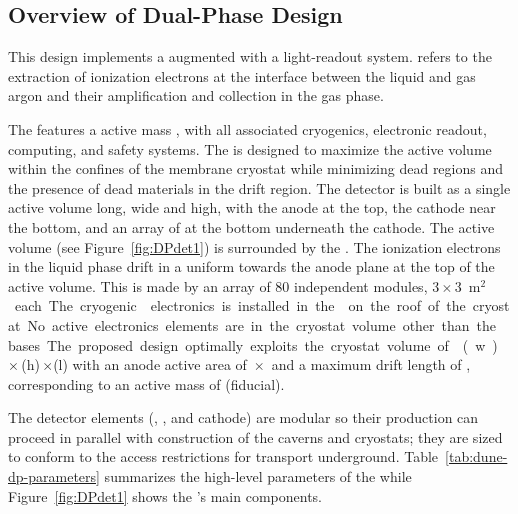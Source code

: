 \subsection{Overview of Dual-Phase Design}
\label{sec:dp-execsum-description}

This  design implements a   augmented with a light-readout system.   refers to the extraction of ionization electrons at the interface between the liquid and gas argon and their amplification and collection in the gas phase.

The  features a  \dpactivelarmass{} active mass , with all associated cryogenics, electronic readout, computing, and safety systems. The  is designed to maximize the active volume within the confines of the membrane cryostat while minimizing dead regions and the presence of dead materials in the drift region. The detector is built as a single active volume \dptpclen long, \dptpcwdth wide and \tpcheight high, with the anode at the top, the cathode near the bottom, and an array of  at the bottom underneath the cathode. The active volume (see Figure~\ref{fig:DPdet1}) is surrounded by the . The ionization electrons in the liquid phase drift  in a uniform \efield towards the anode plane at the top of the active volume. This is made by an array of \num{80} independent  modules, \num{3}\,$\times$\,\SI{3}{m$^2$} each. The cryogenic  electronics is  installed in the  on the roof of the cryostat. No active electronics elements are in the cryostat volume other than the  bases. The proposed design optimally exploits the cryostat volume of \cryostatwdth{}(w)\,$\times$\,\cryostatht{}(h)\,$\times$\cryostatlen{}(l) with an anode active area of \dptpcwdth{}\,$\times$\,\cryostatlen{} and a maximum drift length of \dpmaxdrift{}, corresponding to an active  mass of \dpactivelarmass  (\dpfidlarmass fiducial). 

The detector elements (, , and cathode) are modular so their production can proceed in parallel with  construction of the  caverns and cryostats; they are sized to conform to the access restrictions for transport underground. Table~\ref{tab:dune-dp-parameters} summarizes  the high-level parameters of the  while Figure~\ref{fig:DPdet1} shows the 's main components.

